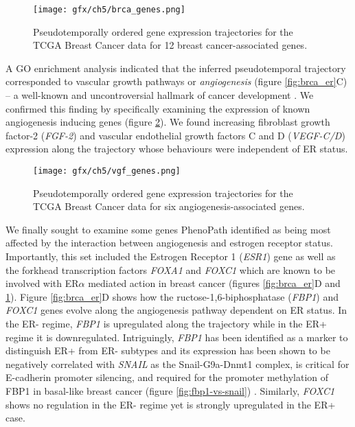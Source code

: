 \begin{figure}
   \texttt{[image: gfx/ch5/brca\_genes.png]}
   \caption{Pseudotemporally ordered gene expression trajectories for the TCGA Breast Cancer data for 12 breast cancer-associated genes.}
	\label{fig:brca_genes}
\end{figure}

A GO enrichment analysis indicated that the inferred pseudotemporal trajectory corresponded to vascular growth pathways or \emph{angiogenesis} (figure \ref{fig:brca_er}C) -- a well-known and uncontroversial hallmark of cancer development \cite{ferrara2002vegf,welti2013recent}. We confirmed this finding by specifically examining the expression of known angiogenesis inducing genes (figure \ref{fig:vgf_genes}). We found increasing fibroblast growth factor-2 (\emph{FGF-2}) and vascular endothelial growth factors C and D (\emph{VEGF-C/D}) expression along the trajectory whose behaviours were independent of ER status.

\begin{figure}
   \texttt{[image: gfx/ch5/vgf\_genes.png]}
   \caption{Pseudotemporally ordered gene expression trajectories for the TCGA Breast Cancer data for six angiogenesis-associated genes.}
	\label{fig:vgf_genes}
\end{figure}

We finally sought to examine some genes PhenoPath identified as being most affected by the interaction between angiogenesis and estrogen receptor status.
Importantly, this set included the Estrogen Receptor 1 (\emph{ESR1})
gene as well as the forkhead transcription factors \emph{FOXA1} and \emph{FOXC1} which are known to be involved with ER$\alpha$ mediated action in breast cancer \cite{lam2013forkhead,yu2016foxc1} (figures \ref{fig:brca_er}D and \ref{fig:brca_genes}).
Figure \ref{fig:brca_er}D shows how the  ructose-1,6-biphosphatase (\emph{FBP1}) and \emph{FOXC1} genes evolve along the angiogenesis pathway dependent on ER status. In the ER- regime, \emph{FBP1} is upregulated along the trajectory while in the ER+ regime it is downregulated. Intriguingly, \emph{FBP1} has been identified as a marker to distinguish ER+ from ER- subtypes and its expression has been shown to be negatively correlated with \emph{SNAIL} as the Snail-G9a-Dnmt1 complex, is critical for E-cadherin promoter silencing, and required for the promoter methylation of FBP1 in basal-like breast cancer (figure \ref{fig:fbp1-vs-snail}) \cite{dong2013loss}. Similarly, \emph{FOXC1} shows no regulation in the ER- regime yet is strongly upregulated in the ER+ case.

